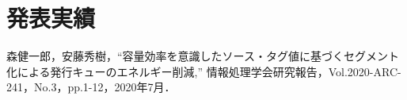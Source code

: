 
\chapter*{発表実績}
\noindent
  森健一郎，安藤秀樹，``容量効率を意識したソース・タグ値に基づくセグメント化による発行キューのエネルギー削減,'' 情報処理学会研究報告，Vol.2020-ARC-241，No.3，pp.1-12，2020年7月．
